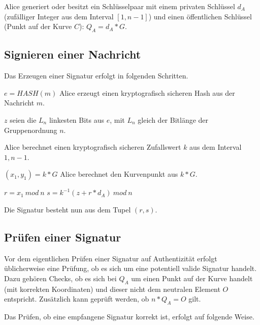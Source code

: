 Alice generiert oder besitzt ein Schlüsselpaar mit einem privaten Schlüssel $d_A$ (zufälliger Integer aus dem Interval $[1, n-1]$) 
und einen öffentlichen Schlüssel (Punkt auf der Kurve $C$): $Q_A = d_A*G$.

\subsection{Signieren einer Nachricht}\label{sign}

Das Erzeugen einer Signatur erfolgt in folgenden Schritten.

\begin{compactenum}[(1)]
	\item $e = HASH(m)$ \newline Alice erzeugt einen kryptografisch sicheren Hash aus der Nachricht $m$.
	\item $z$ seien die $L_n$ linkesten Bits aus $e$, mit $L_n$ gleich der Bitlänge der Gruppenordnung $n$.
	\item Alice berechnet einen kryptografisch sicheren Zufallswert $k$ aus dem Interval $1, n-1$.
	\item $(x_1, y_1) = k * G$ \newline Alice berechnet den Kurvenpunkt aus $k*G$.
	\item $r = x_1\ mod\ n$ \newline $s = k^{-1}(z+r*d_A)\ mod\ n$
\end{compactenum}

Die Signatur besteht nun aus dem Tupel $(r,s)$.

\subsection{Prüfen einer Signatur}\label{validate_Signature}

Vor dem eigentlichen Prüfen einer Signatur auf Authentizität erfolgt üblicherweise eine Prüfung, ob es sich um
eine potentiell valide Signatur handelt. Dazu gehören Checks, ob es sich bei $Q_A$ um einen Punkt auf der Kurve handelt
(mit korrekten Koordinaten) und dieser nicht dem neutralen Element $O$ entspricht. Zusätzlich kann geprüft werden, ob 
$n*Q_A = O$ gilt.

Das Prüfen, ob eine empfangene Signatur korrekt ist, erfolgt auf folgende Weise.


